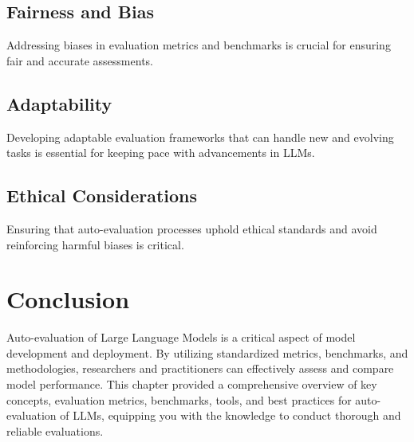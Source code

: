 \subsection{Fairness and Bias}
Addressing biases in evaluation metrics and benchmarks is crucial for ensuring fair and accurate assessments.

\subsection{Adaptability}
Developing adaptable evaluation frameworks that can handle new and evolving tasks is essential for keeping pace with advancements in LLMs.

\subsection{Ethical Considerations}
Ensuring that auto-evaluation processes uphold ethical standards and avoid reinforcing harmful biases is critical.

\section{Conclusion}
Auto-evaluation of Large Language Models is a critical aspect of model development and deployment. By utilizing standardized metrics, benchmarks, and methodologies, researchers and practitioners can effectively assess and compare model performance. This chapter provided a comprehensive overview of key concepts, evaluation metrics, benchmarks, tools, and best practices for auto-evaluation of LLMs, equipping you with the knowledge to conduct thorough and reliable evaluations.


% 
% 